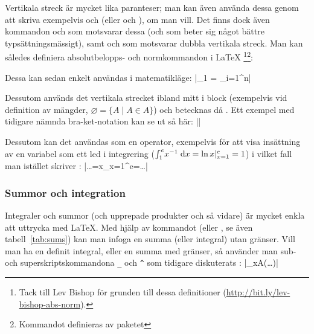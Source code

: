 \documentclass[../../a4.tex]{subfiles}
\begin{document}
Vertikala streck är mycket lika paranteser; man kan även använda dessa
genom att skriva exempelvis  och  (eller
 och ), om man
vill. Det
finns dock även kommandon  och  som motsvarar dessa
(och som beter sig något bättre typsättningsmässigt),
samt  och  som motsvarar dubbla vertikala streck.
Man kan således definiera absolutbelopps- och normkommandon i \LaTeX%
\footnote{Tack till Lev Bishop för grunden till dessa definitioner 
(\url{http://bit.ly/lev-bishop-abs-norm}).}\footnote{Kommandot
 definieras av paketet }:
\begin{latexcode}
\DeclarePairedDelimiter\abs{\lvert}{\rvert}
\DeclarePairedDelimiter\norm{\lVert}{\rVert}
\end{latexcode}
\label{cmd:declarepaireddelimiter}
Dessa kan sedan enkelt användas i matematikläge:
\latex|_1 = \sum_{i=1}^n|

Dessutom används det vertikala strecket ibland mitt i block (exempelvis
vid definition av mängder, \(\varnothing = \{A \mid A \in A\}\)) och
betecknas då . Ett exempel med tidigare nämnda bra-ket-notation
kan se ut så här: \label{sec:3:mid}
\latex|\left\langle\psi\mid\Psi\right\rangle|

Dessutom kan det användas som en operator,
exempelvis för att visa insättning av en variabel som ett led i
integrering (\(\int_1^e\! x^{-1}\d{x}=\ln x\vert_{x=1}^e=1 \)) i vilket
fall man istället skriver :
\latex|\ldots=\ln x\vert_{x=1}^e=\ldots|

\subsubsection{Summor och integration}
Integraler och summor (och upprepade produkter och så vidare) är mycket
enkla att uttrycka med \LaTeX{}. Med hjälp av kommandot  (eller
, se även tabell~\vref{tab:sums}) kan man infoga en summa (eller
integral) utan gränser. Vill man ha en definit integral, eller en summa
med gränser, så använder man sub- och superskriptskommandona \verb|_| och
\verb|^| som tidigare diskuterats :
\latex|\sum_{x\in A}\left(\ldots\right)|
\end{document}
